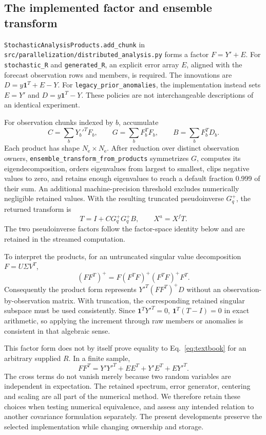 \documentclass[11pt,a4paper]{article}
\newcommand{\code}[1]{\nolinkurl{#1}}
\newcommand{\Ne}{N_{\mathrm e}}
\begin{document}
\subsection{The implemented factor and ensemble transform}
\code{StochasticAnalysisProducts.add_chunk} in \code{src/parallelization/distributed_analysis.py} forms a factor \(F=Y'+E\). For \code{stochastic_R} and \code{generated_R}, an explicit error array \(E\), aligned with the forecast observation rows and members, is required. The innovations are \(D=y\mathbf1^T+E-Y\). For \code{legacy_prior_anomalies}, the implementation instead sets \(E=Y'\) and \(D=y\mathbf1^T-Y\). These policies are not interchangeable descriptions of an identical experiment.

For observation chunks indexed by \(b\), accumulate
\begin{equation}
 C=\sum_b Y_b'^TF_b,\qquad
 G=\sum_b F_b^TF_b,\qquad
 B=\sum_b F_b^TD_b.
 \label{eq:products}
\end{equation}
Each product has shape \(\Ne\times\Ne\). After reduction over distinct observation owners, \code{ensemble_transform_from_products} symmetrizes \(G\), computes its eigendecomposition, orders eigenvalues from largest to smallest, clips negative values to zero, and retains enough eigenvalues to reach a default fraction 0.999 of their sum. An additional machine-precision threshold excludes numerically negligible retained values. With the resulting truncated pseudoinverse \(G_q^+\), the returned transform is
\begin{equation}
 T=I+C G_q^+G_q^+B,\qquad X^a=X^f T.
 \label{eq:transform}
\end{equation}
The two pseudoinverse factors follow the factor-space identity below and are retained in the streamed computation.

To interpret the products, for an untruncated singular value decomposition \(F=U\Sigma V^T\),
\begin{equation}
 (FF^T)^+=F(F^TF)^+(F^TF)^+F^T.
\end{equation}
Consequently the product form represents \(Y'^T(FF^T)^+D\) without an observation-by-observation matrix. With truncation, the corresponding retained singular subspace must be used consistently. Since \(\mathbf1^TY'^T=0\), \(\mathbf1^T(T-I)=0\) in exact arithmetic, so applying the increment through raw members or anomalies is consistent in that algebraic sense.

This factor form does not by itself prove equality to Eq.~\ref{eq:textbook} for an arbitrary supplied \(R\). In a finite sample,
\begin{equation}
 FF^T=Y'Y'^T+EE^T+Y'E^T+EY'^T.
\end{equation}
The cross terms do not vanish merely because two random variables are independent in expectation. The retained spectrum, error generator, centering and scaling are all part of the numerical method. We therefore retain these choices when testing numerical equivalence, and assess any intended relation to another covariance formulation separately. The present developments preserve the selected implementation while changing ownership and storage.
\end{document}
